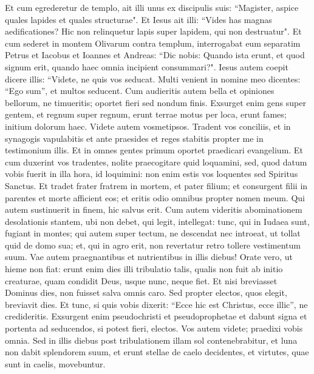 \begin{biblechapter}  
\verse Et cum egrederetur de templo, ait illi unus ex discipulis suis: “Magister, aspice quales lapides et quales structurae". 
\verse Et Iesus ait illi: “Vides has magnas aedificationes? Hic non relinquetur lapis super lapidem, qui non destruatur". 
\verse Et cum sederet in montem Olivarum contra templum, interrogabat eum separatim Petrus et Iacobus et Ioannes et Andreas: 
\verse “Dic nobis: Quando ista erunt, et quod signum erit, quando haec omnia incipient consummari?". 
\verse Iesus autem coepit dicere illis: “Videte, ne quis vos seducat. 
\verse Multi venient in nomine meo dicentes: “Ego sum”, et multos seducent. 
\verse Cum audieritis autem bella et opiniones bellorum, ne timueritis; oportet fieri sed nondum finis. 
\verse Exsurget enim gens super gentem, et regnum super regnum, erunt terrae motus per loca, erunt fames; initium dolorum haec. 
\verse Videte autem vosmetipsos. Tradent vos conciliis, et in synagogis vapulabitis et ante praesides et reges stabitis propter me in testimonium illis. 
\verse Et in omnes gentes primum oportet praedicari evangelium. 
\verse Et cum duxerint vos tradentes, nolite praecogitare quid loquamini, sed, quod datum vobis fuerit in illa hora, id loquimini: non enim estis vos loquentes sed Spiritus Sanctus.  
\verse Et tradet frater fratrem in mortem, et pater filium; et consurgent filii in parentes et morte afficient eos; 
\verse et eritis odio omnibus propter nomen meum. Qui autem sustinuerit in finem, hic salvus erit. 
\verse Cum autem videritis abominationem desolationis stantem, ubi non debet, qui legit, intellegat: tunc, qui in Iudaea sunt, fugiant in montes; 
\verse qui autem super tectum, ne descendat nec introeat, ut tollat quid de domo sua; 
\verse et, qui in agro erit, non revertatur retro tollere vestimentum suum. 
\verse Vae autem praegnantibus et nutrientibus in illis diebus! 
\verse Orate vero, ut hieme non fiat: 
\verse erunt enim dies illi tribulatio talis, qualis non fuit ab initio creaturae, quam condidit Deus, usque nunc, neque fiet. 
\verse Et nisi breviasset Dominus dies, non fuisset salva omnis caro. Sed propter electos, quos elegit, breviavit dies. 
\verse Et tunc, si quis vobis dixerit: “Ecce hic est Christus, ecce illic”, ne credideritis. 
\verse Exsurgent enim pseudochristi et pseudoprophetae et dabunt signa et portenta ad seducendos, si potest fieri, electos. 
\verse Vos autem videte; praedixi vobis omnia. 
\verse Sed in illis diebus post tribulationem illam sol contenebrabitur, et luna non dabit splendorem suum, 
\verse et erunt stellae de caelo decidentes, et virtutes, quae sunt in caelis, movebuntur. 

\end{biblechapter}
